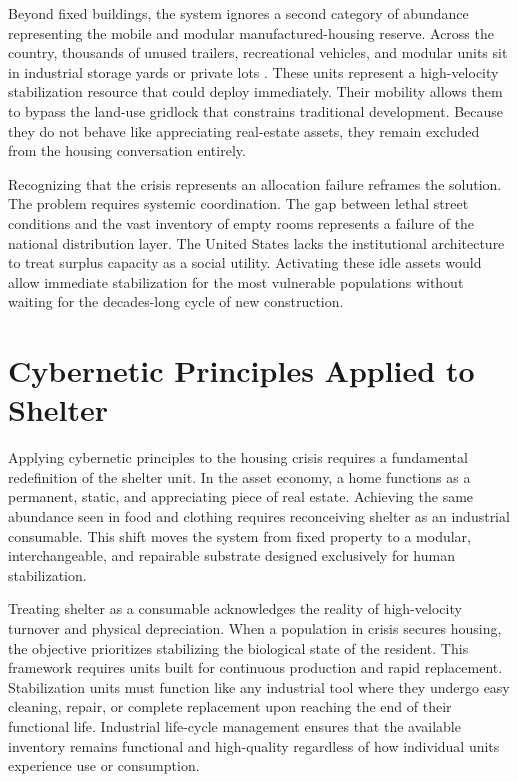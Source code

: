 \documentclass[12pt, letterpaper]{article}
\begin{document}
Beyond fixed buildings, the system ignores a second category of abundance representing the mobile and modular manufactured-housing reserve. Across the country, thousands of unused trailers, recreational vehicles, and modular units sit in industrial storage yards or private lots \citep{hud_manufactured_2024, rvia_2024}. These units represent a high-velocity stabilization resource that could deploy immediately. Their mobility allows them to bypass the land-use gridlock that constrains traditional development. Because they do not behave like appreciating real-estate assets, they remain excluded from the housing conversation entirely.

Recognizing that the crisis represents an allocation failure reframes the solution. The problem requires systemic coordination. The gap between lethal street conditions and the vast inventory of empty rooms represents a failure of the national distribution layer. The United States lacks the institutional architecture to treat surplus capacity as a social utility. Activating these idle assets would allow immediate stabilization for the most vulnerable populations without waiting for the decades-long cycle of new construction.

\section{Cybernetic Principles Applied to Shelter}

Applying cybernetic principles to the housing crisis requires a fundamental redefinition of the shelter unit. In the asset economy, a home functions as a permanent, static, and appreciating piece of real estate. Achieving the same abundance seen in food and clothing requires reconceiving shelter as an industrial consumable. This shift moves the system from fixed property to a modular, interchangeable, and repairable substrate designed exclusively for human stabilization.

Treating shelter as a consumable acknowledges the reality of high-velocity turnover and physical depreciation. When a population in crisis secures housing, the objective prioritizes stabilizing the biological state of the resident. This framework requires units built for continuous production and rapid replacement. Stabilization units must function like any industrial tool where they undergo easy cleaning, repair, or complete replacement upon reaching the end of their functional life. Industrial life-cycle management ensures that the available inventory remains functional and high-quality regardless of how individual units experience use or consumption.
\end{document}
